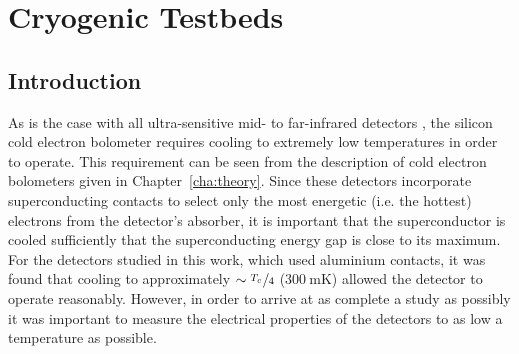 \chapter{Cryogenic Testbeds}
\label{cha:testbeds}
%
\section{Introduction}\label{sec:testbeds_Introduction}
As is the case with all ultra-sensitive mid- to far-infrared detectors \parencite[as described by][]{Richards1994}, the silicon cold electron bolometer requires cooling to extremely low temperatures in order to operate. This requirement can be seen from the description of cold electron bolometers given in Chapter~\ref{cha:theory}. Since these detectors incorporate superconducting contacts to select only the most energetic (i.e. the hottest) electrons from the detector's absorber, it is important that the superconductor is cooled sufficiently that the superconducting energy gap is close to its maximum. For the detectors studied in this work, which used aluminium contacts, it was found  that cooling to approximately $\sim \nicefrac{T_{c}\,}{4}$ ($300~\mathrm{mK}$) allowed the detector to operate reasonably. However, in order to arrive at as complete a study as possibly it was important to measure the electrical properties of the detectors to as low a temperature as possible.
\par 
